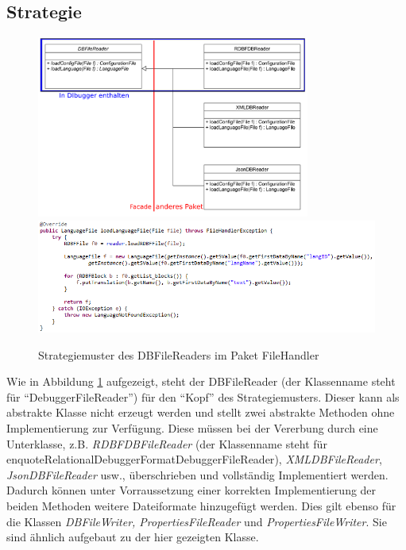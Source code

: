\documentclass[parskip=full]{scrartcl}
\begin{document}
\subsection{Strategie}
\begin{figure}[!h]
\centering
\includegraphics[width=0.8\textwidth]{document_data/Strategy_uml_d.pdf}
\includegraphics[width=1.0\textwidth]{document_data/loadLangFile.png}
\caption{Strategiemuster des DBFileReaders im Paket FileHandler}
\label{fig:strategy_fh}
\end{figure}
Wie in Abbildung \ref{fig:strategy_fh} aufgezeigt, steht der DBFileReader (der Klassenname steht für \enquote{DebuggerFileReader}) für den \enquote{Kopf} des Strategiemusters.
Dieser kann als abstrakte Klasse nicht erzeugt werden und stellt zwei abstrakte Methoden ohne Implementierung zur Verfügung.
Diese müssen bei der Vererbung durch eine Unterklasse, z.B. \textit{RDBFDBFileReader} (der Klassenname steht für enquote{RelationalDebuggerFormatDebuggerFileReader}), \textit{XMLDBFileReader}, \textit{JsonDBFileReader} usw., überschrieben und vollständig Implementiert werden.
Dadurch können unter Vorraussetzung einer korrekten Implementierung der beiden Methoden weitere Dateiformate hinzugefügt werden.
Dies gilt ebenso für die Klassen \textit{DBFileWriter, PropertiesFileReader} und \textit{PropertiesFileWriter}. Sie sind ähnlich aufgebaut zu der hier gezeigten Klasse.
\end{document}
